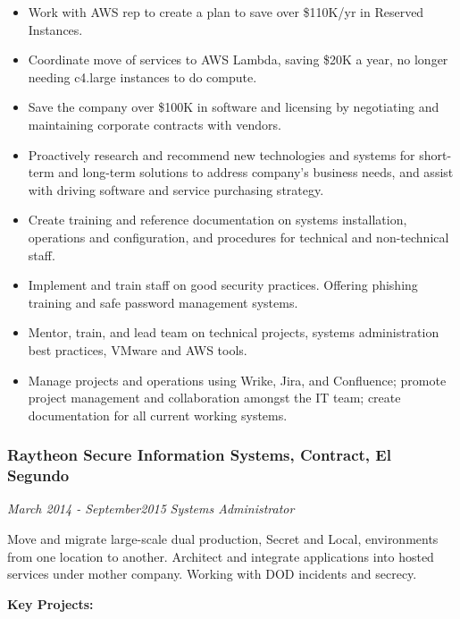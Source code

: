 \documentclass[]{article}
\providecommand{\tightlist}{%
  \setlength{\itemsep}{0pt}\setlength{\parskip}{0pt}}
\begin{document}
\begin{itemize}
\tightlist
\item
  Work with AWS rep to create a plan to save over \$110K/yr in Reserved
  Instances.
\item
  Coordinate move of services to AWS Lambda, saving \$20K a year, no
  longer needing c4.large instances to do compute.
\item
  Save the company over \$100K in software and licensing by negotiating
  and maintaining corporate contracts with vendors.
\item
  Proactively research and recommend new technologies and systems for
  short-term and long-term solutions to address company's business
  needs, and assist with driving software and service purchasing
  strategy.
\item
  Create training and reference documentation on systems installation,
  operations and configuration, and procedures for technical and
  non-technical staff.
\item
  Implement and train staff on good security practices. Offering
  phishing training and safe password management systems.
\item
  Mentor, train, and lead team on technical projects, systems
  administration best practices, VMware and AWS tools.
\item
  Manage projects and operations using Wrike, Jira, and Confluence;
  promote project management and collaboration amongst the IT team;
  create documentation for all current working systems.
\end{itemize}

\hypertarget{raytheon-secure-information-systems-contract-el-segundo}{%
\subsubsection{Raytheon Secure Information Systems, Contract, El
Segundo}\label{raytheon-secure-information-systems-contract-el-segundo}}

\emph{March 2014 - September2015} \emph{Systems Administrator}

Move and migrate large-scale dual production, Secret and Local,
environments from one location to another. Architect and integrate
applications into hosted services under mother company. Working with DOD
incidents and secrecy.

\textbf{Key Projects:}
\end{document}
